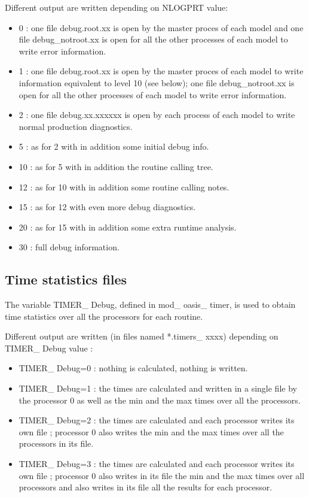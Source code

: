 Different output are written depending on NLOGPRT value:
\begin{itemize}
\item {0}  : one file debug.root.xx is open by the master proces of each model and one file debug\_notroot.xx is open for all the other processes of each model to write error information.
\item {1}  : one file debug.root.xx is open by the master proces of each model to write information equivalent to level 10 (see below); one file debug\_notroot.xx is open for all the other processes of each model to write error information.
\item {2}  : one file debug.xx.xxxxxx is open by each process of each model to write normal production diagnostics.
\item {5}  : as for 2 with in addition some initial debug info.
\item {10} : as for 5 with in addition the routine calling tree.
\item {12} : as for 10 with in addition some routine calling notes.
\item {15} : as for 12 with even more debug diagnostics.
\item {20} : as for 15 with in addition some extra runtime analysis.
\item {30} : full debug information.
\end{itemize}

\subsection{Time statistics files}

The variable TIMER\_ Debug, defined in mod\_ oasis\_ timer, is used to obtain time statistics over all the processors for each routine.

Different output are written (in files named *.timers\_ xxxx) depending on TIMER\_ Debug value :

\begin{itemize}
\item {TIMER\_ Debug=0} : nothing is calculated, nothing is written.
\item {TIMER\_ Debug=1} : the times are calculated and written in a single file by the processor 0 as well as 
the min and the max times over all the processors.
\item {TIMER\_ Debug=2} : the times are calculated and each processor writes its own file ; processor 0 also 
writes the min and the max times over all the processors in its file.
\item {TIMER\_ Debug=3} : the times are calculated and each processor writes its own file ; processor 0 also 
writes in its file the min and the max times over all processors and also writes in its file all the results for each processor.
\end{itemize}

